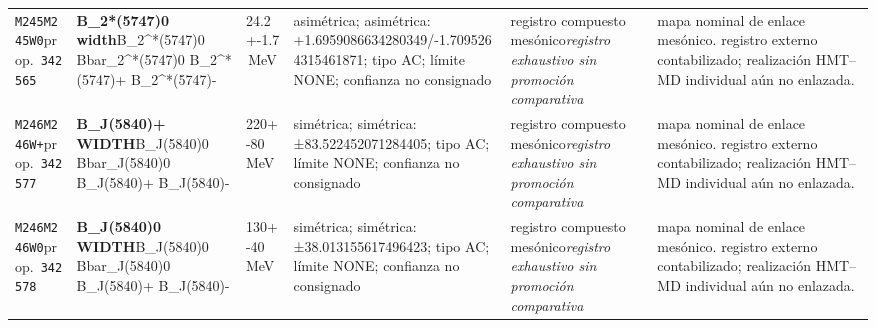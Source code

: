 \begin{landscape}
\begin{longtable}{L{1.85cm}L{4.45cm}L{2.35cm}L{4.05cm}L{3.35cm}L{7.15cm}}
\texttt{M245}\newline \texttt{M245W0}\newline prop.\ \texttt{342565} & \textbf{B\_\allowbreak{}2*(5747)0 width}\newline B\_\allowbreak{}2\textasciicircum{}*(5747)0 \textbar{}\allowbreak{} Bbar\_\allowbreak{}2\textasciicircum{}*(5747)0 \textbar{}\allowbreak{} B\_\allowbreak{}2\textasciicircum{}*(5747)+ \textbar{}\allowbreak{} B\_\allowbreak{}2\textasciicircum{}*(5747)- & 24.2+-1.7\,MeV & asimétrica; asimétrica: +1.6959086634280349/-1.7095264315461871; tipo AC; límite NONE; confianza no consignado & registro compuesto mesónico\newline \emph{registro exhaustivo sin promoción comparativa} & mapa nominal de enlace mesónico. registro externo contabilizado; realización HMT--MD individual aún no enlazada. \\
\texttt{M246}\newline \texttt{M246W+}\newline prop.\ \texttt{342577} & \textbf{B\_\allowbreak{}J(5840)+ WIDTH}\newline B\_\allowbreak{}J(5840)0 \textbar{}\allowbreak{} Bbar\_\allowbreak{}J(5840)0 \textbar{}\allowbreak{} B\_\allowbreak{}J(5840)+ \textbar{}\allowbreak{} B\_\allowbreak{}J(5840)- & 220+-80\,MeV & simétrica; simétrica: ±83.522452071284405; tipo AC; límite NONE; confianza no consignado & registro compuesto mesónico\newline \emph{registro exhaustivo sin promoción comparativa} & mapa nominal de enlace mesónico. registro externo contabilizado; realización HMT--MD individual aún no enlazada. \\
\texttt{M246}\newline \texttt{M246W0}\newline prop.\ \texttt{342578} & \textbf{B\_\allowbreak{}J(5840)0 WIDTH}\newline B\_\allowbreak{}J(5840)0 \textbar{}\allowbreak{} Bbar\_\allowbreak{}J(5840)0 \textbar{}\allowbreak{} B\_\allowbreak{}J(5840)+ \textbar{}\allowbreak{} B\_\allowbreak{}J(5840)- & 130+-40\,MeV & simétrica; simétrica: ±38.013155617496423; tipo AC; límite NONE; confianza no consignado & registro compuesto mesónico\newline \emph{registro exhaustivo sin promoción comparativa} & mapa nominal de enlace mesónico. registro externo contabilizado; realización HMT--MD individual aún no enlazada. \\

\end{longtable}
\end{landscape}
